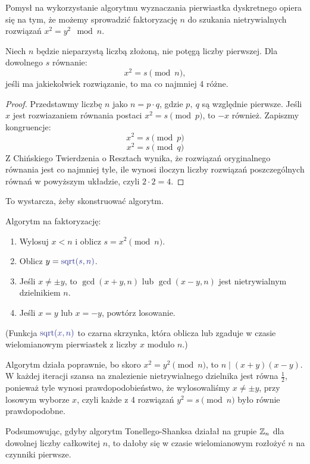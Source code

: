 Pomysł na wykorzystanie algorytmu wyznaczania pierwiastka dyskretnego opiera się na tym, że możemy sprowadzić faktoryzację \( n \) do szukania nietrywialnych rozwiązań \( x^2 = y^2 \mod n \).

\begin{lemma}
Niech \( n \) będzie nieparzystą liczbą złożoną, nie potęgą liczby pierwszej. Dla dowolnego \( s \) równanie:
\[
    x^2 = s \pmod{n},
\]
jeśli ma jakiekolwiek rozwiązanie, to ma co najmniej 4 różne.
\end{lemma}
\begin{proof}
    Przedstawmy liczbę \( n \) jako \( n = p \cdot q \), gdzie \( p, \ q \) są względnie pierwsze. Jeśli \( x \) jest rozwiazaniem równania postaci \( x^2 = s \pmod{p} \), to \( -x \) również. Zapiszmy kongruencje:
    \[
        x^2 = s \pmod{p}
    \]
    \[
        x^2 = s \pmod{q}
    \]
    Z Chińskiego Twierdzenia o Resztach wynika, że rozwiązań oryginalnego równania jest co najmniej tyle, ile wynosi iloczyn liczby rozwiązań poszczególnych równań w powyższym układzie, czyli \( 2 \cdot 2 = 4 \).
\end{proof}

To wystarcza, żeby skonstruować algorytm.
\begin{greyframe}
    Algorytm na faktoryzację:
    \begin{enumerate}
        \item Wylosuj \( x < n \) i oblicz \( s = x^2 \pmod{n} \).
        \item Oblicz \( y = \textcolor{Blue}{\text{sqrt}(s, n)} \).
        \item Jeśli \( x \neq \pm y \), to \( \gcd(x + y, n) \) lub \( \gcd(x - y, n) \) jest nietrywialnym dzielnikiem \( n \).
        \item Jeśli \( x = y \) lub \( x = -y \), powtórz losowanie.
    \end{enumerate}
\end{greyframe}
{\small (Funkcja \( \textcolor{Blue}{\text{sqrt}(x, n)} \) to czarna skrzynka, która oblicza lub zgaduje w czasie wielomianowym pierwiastek z liczby \( x \) modulo \( n \).)}

Algorytm działa poprawnie, bo skoro \( x^2 = y^2 \pmod{n} \), to \( n \mid (x + y)(x - y) \). W każdej iteracji szansa na znalezienie nietrywialnego dzielnika jest równa \( \frac{1}{2} \), ponieważ tyle wynosi prawdopodobieństwo, że wylosowaliśmy \( x \neq \pm y \), przy losowym wyborze \( x \), czyli każde z 4 rozwiązań \( y^2 = s \pmod{n} \) było równie prawdopodobne.

Podsumowując, gdyby algorytm Tonellego-Shanksa działał na grupie \( \mathbb{Z}_n \) dla dowolnej liczby całkowitej \( n \), to dałoby się w czasie wielomianowym rozłożyć \( n \) na czynniki pierwsze.